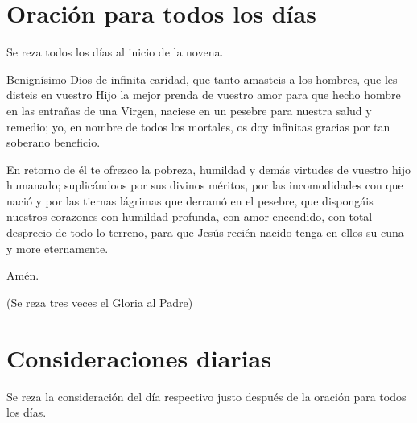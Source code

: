 \documentclass[spanish,utf8,twocolumn]{chlart}
\newenvironment{summary}{\begingroup
	\small\sffamily\itshape%
	\setlength{\leftskip}{3em}\setlength{\rightskip}{3em}\noindent
	}{\par\endgroup}
\newenvironment{lectura}{\begingroup\color{lector}}{\endgroup\par}
\newenvironment{finalnotes}{\begingroup
	\footnotesize\sffamily\color{Gray}%
	\setlength{\leftskip}{3em}\setlength{\rightskip}{3em}\noindent
	}{\par\endgroup}
\begin{document}
\section{Oración para todos los días}
\begin{summary}
Se reza todos los días al inicio de la novena.
\end{summary}
\begin{lectura}
Benignísimo Dios de infinita caridad, que tanto amasteis a los hombres,
que les disteis en vuestro Hijo la mejor prenda de vuestro amor para que
hecho hombre en las entrañas de una Virgen, naciese en un pesebre para
nuestra salud y remedio; yo, en nombre de todos los mortales, os doy
infinitas gracias por tan soberano beneficio.

En retorno de él te ofrezco la pobreza, humildad y demás virtudes de
vuestro hijo humanado; suplicándoos por sus divinos méritos, por las
incomodidades con que nació y por las tiernas lágrimas que derramó en
el pesebre, que dispongáis nuestros corazones con humildad profunda,
con amor encendido, con total desprecio de todo lo terreno, para que
Jesús recién nacido tenga en ellos su cuna y more eternamente.

Amén.
\end{lectura}
\begin{finalnotes}
(Se reza tres veces el Gloria al Padre)
\end{finalnotes}

\section{Consideraciones diarias}
\begin{summary}
Se reza la consideración del día respectivo justo después de la
oración para todos los días.
\end{summary}
\end{document}
